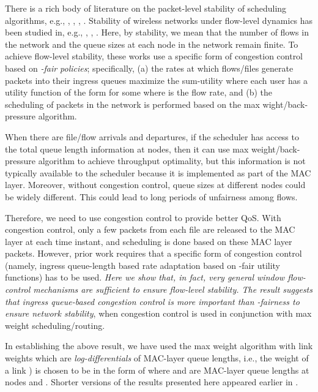 \documentclass[10pt,onecolumn,draftclsnofoot,journal]{IEEEtran}
\begin{document}
There is a rich body of literature on the packet-level stability of scheduling algorithms, e.g., \cite{eph}, \cite{Neely}, \cite{KM01}, \cite{srikant}. Stability of wireless networks under flow-level dynamics
has been studied in, e.g., \cite{LNS08}, \cite{LPYCP07}, \cite{MS10}. Here, by stability, we mean
that the number of flows in the network and the queue sizes
at each node in the network remain finite. To achieve flow-level stability, these works use a specific form of congestion control based on \textit{-fair policies}; specifically, (a) the rates at which flows/files
generate packets into their ingress queues maximize the sum-utility where each user has a utility function of the form  for some  where  is the flow rate, and (b) the scheduling of packets in the network
is performed based on the max wight/back-pressure algorithm.


When there are file/flow arrivals and departures,
if the scheduler has access to the total queue length information at nodes, then it can use max weight/back-pressure algorithm to achieve throughput optimality, but this information is not typically available to the scheduler because it is implemented as part of the MAC layer. Moreover, without congestion control, queue sizes at different nodes could be widely different. This could lead to long periods of unfairness among flows.


Therefore, we need to use congestion control to provide better QoS. With congestion control, only a few packets from each file are released to the MAC layer at each time instant, and scheduling is done based on these MAC layer packets. However, prior work requires that a specific form of congestion control (namely, ingress queue-length based rate adaptation based on -fair utility functions) has to be used. \textit{Here we show that, in fact, very general window flow-control mechanisms are sufficient to ensure flow-level stability. The result suggests that ingress queue-based congestion control is more important than -fairness to ensure network stability}, when congestion control is used in conjunction with max weight scheduling/routing.


In establishing the above result, we have used the max weight algorithm with link weights which are \textit{log-differentials} of MAC-layer queue lengths, i.e., the weight of a link ) is chosen to be in the form of  where  and  are MAC-layer queue lengths at nodes  and .
Shorter versions of the results presented here appeared earlier in \cite{GTS12, javad, tianxiong}.
\end{document}

